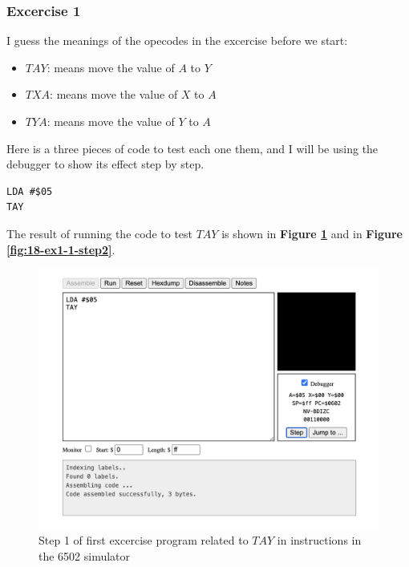 \documentclass[a4paper]{article}
\begin{document}
\subsubsection{Excercise 1}

I guess the meanings of the opecodes in the excercise before we start:

\begin{itemize}
    \item $TAY$: means move the value of $A$ to $Y$
    \item $TXA$: means move the value of $X$ to $A$
    \item $TYA$: means move the value of $Y$ to $A$
\end{itemize}

Here is a three pieces of code to test each one them, and I will be using the debugger to show its effect step by step.

\begin{lstlisting}[style=6502asm]
LDA #$05
TAY
\end{lstlisting}

The result of running the code to test $TAY$ is shown in \textbf{Figure \ref{fig:17-ex1-1-step1}} and in \textbf{Figure \ref{fig:18-ex1-1-step2}}.

\begin{figure}[H]
    \centering
    \includegraphics[width=1.0\textwidth]{res/images/q2/17-ex1-1-step1.png}
    \caption{Step 1 of first excercise program related to $TAY$ in instructions in the 6502 simulator}
    \label{fig:17-ex1-1-step1}
\end{figure}
\end{document}
